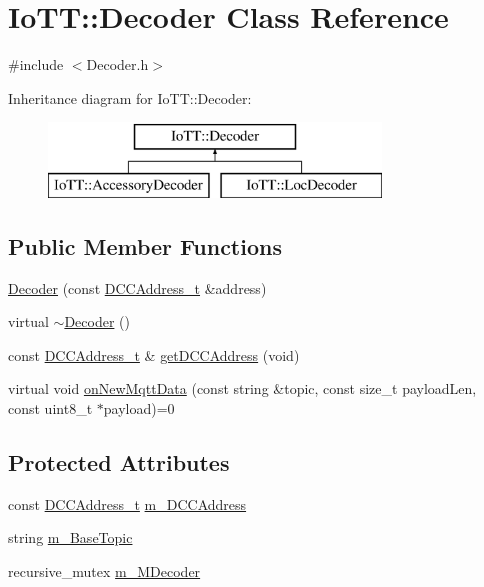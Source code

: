 \hypertarget{classIoTT_1_1Decoder}{}\section{Io\+TT\+:\+:Decoder Class Reference}
\label{classIoTT_1_1Decoder}


{\ttfamily \#include $<$Decoder.\+h$>$}

Inheritance diagram for Io\+TT\+:\+:Decoder\+:\begin{figure}[H]
\begin{center}
\leavevmode
\includegraphics[height=2.000000cm]{classIoTT_1_1Decoder}
\end{center}
\end{figure}
\subsection*{Public Member Functions}
\begin{DoxyCompactItemize}
\item 
\hyperlink{classIoTT_1_1Decoder_aa4c9e61bda47768c3ba226feef9de4fa}{Decoder} (const \hyperlink{namespaceIoTT_a31b8cd9473fc447b3fb341b78afa54fe}{D\+C\+C\+Address\+\_\+t} \&address)
\item 
virtual \hyperlink{classIoTT_1_1Decoder_a4fd222d1e7c4961e22d0dbba0add46ab}{$\sim$\+Decoder} ()
\item 
const \hyperlink{namespaceIoTT_a31b8cd9473fc447b3fb341b78afa54fe}{D\+C\+C\+Address\+\_\+t} \& \hyperlink{classIoTT_1_1Decoder_a7f1dff064ec8d207955f600fba70062f}{get\+D\+C\+C\+Address} (void)
\item 
virtual void \hyperlink{classIoTT_1_1Decoder_aba63fd0a28594e3b23fb6e436417e325}{on\+New\+Mqtt\+Data} (const string \&topic, const size\+\_\+t payload\+Len, const uint8\+\_\+t $\ast$payload)=0
\end{DoxyCompactItemize}
\subsection*{Protected Attributes}
\begin{DoxyCompactItemize}
\item 
const \hyperlink{namespaceIoTT_a31b8cd9473fc447b3fb341b78afa54fe}{D\+C\+C\+Address\+\_\+t} \hyperlink{classIoTT_1_1Decoder_a6003d2a748d7b408285198d0bef0ed8d}{m\+\_\+\+D\+C\+C\+Address}
\item 
string \hyperlink{classIoTT_1_1Decoder_a441119df006f3149f44321369cbc5882}{m\+\_\+\+Base\+Topic}
\item 
recursive\+\_\+mutex \hyperlink{classIoTT_1_1Decoder_a2848111b5585ea86a9b7313f681759c7}{m\+\_\+\+M\+Decoder}
\end{DoxyCompactItemize}


